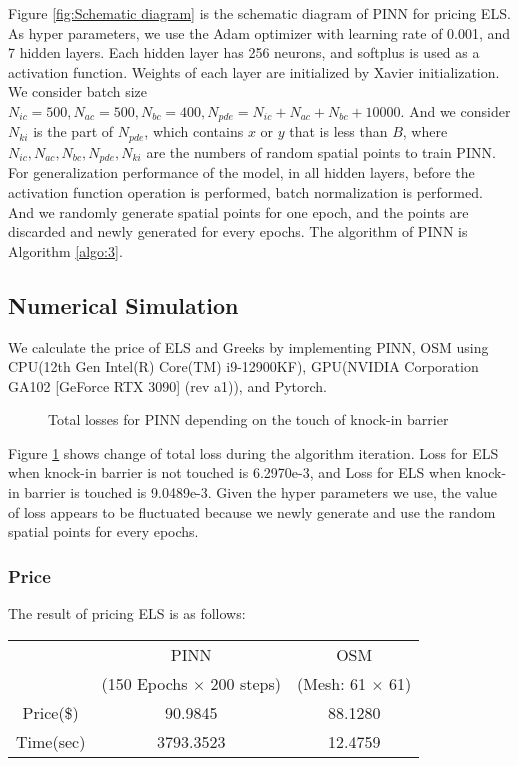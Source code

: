 \documentclass[11pt,reqno]{article}
\numberwithin{equation}{section}
\begin{document}
{Figure \ref{fig:Schematic diagram} is the schematic diagram of PINN for pricing ELS.
 As hyper parameters, we use the Adam optimizer with learning rate of 0.001, and 7 hidden layers.
  Each hidden layer has 256 neurons, and softplus is used as a activation function.
   Weights of each layer are initialized by Xavier initialization. 
   We consider batch size
    $N_{ic} = 500, N_{ac} = 500, N_{bc} = 400, N_{pde} = N_{ic} + N_{ac} + N_{bc} + 10000$.
 And we consider $N_{ki}$ is the part of $N_{pde}$, which contains $x$ or $y$ that is less than $B$,
  where $N_{ic}, N_{ac}, N_{bc}, N_{pde}, N_{ki}$ are the numbers of random spatial points to train PINN.
For generalization performance of the model, in all hidden layers,
 before the activation function operation is performed, batch normalization is performed.
And we randomly generate spatial points for one epoch, and the points are discarded
 and newly generated for every epochs. The algorithm of PINN is Algorithm \ref{algo:3}.

\subsection{Numerical Simulation}
We calculate the price of ELS and Greeks by implementing PINN, OSM
 using CPU(12th Gen Intel(R) Core(TM) i9-12900KF), GPU(NVIDIA Corporation GA102
 [GeForce RTX 3090] (rev a1)), and Pytorch. 

\begin{figure}[H]
\centering
 \caption{Total losses for PINN depending on the touch of knock-in barrier}  
 \label{fig:Loss}
\end{figure}

Figure \ref{fig:Loss} shows change of total loss during the algorithm iteration. Loss for ELS when knock-in barrier is not touched is 6.2970e-3, and Loss for ELS when knock-in barrier is touched is 9.0489e-3. Given the hyper parameters we use, the value of loss appears to be fluctuated because we newly generate and use the random spatial points for every epochs.

\subsubsection{Price}
The result of pricing ELS is as follows:

\begin{table}[H]\small
\centering
\begin{tabular}{ccc}
\hline
          & PINN                            & OSM                    \\
          & (150 Epochs $\times$ 200 steps) & (Mesh: 61 $\times$ 61) \\ \hline
Price(\$) & 90.9845                         & 88.1280                \\ 
Time(sec) & 3793.3523                       & 12.4759                \\ \hline
\end{tabular}
\end{table}

}
\end{document}
